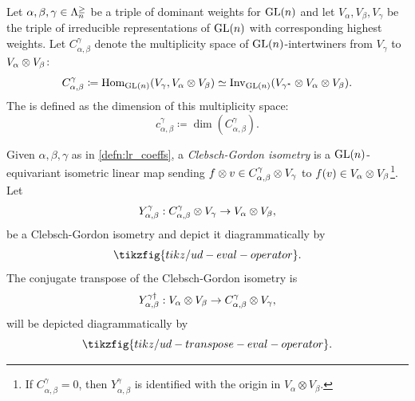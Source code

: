 \documentclass[notitlepage, 10pt]{article}
\begin{document}
\begin{defn}
    \label{defn:lr_coeffs}
    Let $\alpha, \beta, \gamma \in \Lambda^{\geq}_{n}$ be a triple of dominant weights for $\operatorname{GL}(n)$ and let $V_{\alpha},V_{\beta},V_{\gamma}$ be the triple of irreducible representations of $\operatorname{GL}(n)$ with corresponding highest weights.
    Let $C_{\alpha, \beta}^{\gamma}$ denote the multiplicity space of $\operatorname{GL}(n)$-intertwiners from $V_{\gamma}$ to $V_{\alpha} \otimes V_{\beta}$:
    \begin{equation}
        C_{\alpha, \beta}^{\gamma} \coloneqq \operatorname{Hom}_{\operatorname{GL}(n)}(V_{\gamma}, V_{\alpha}\otimes V_{\beta}) \simeq \operatorname{Inv}_{\operatorname{GL}(n)}(V_{\gamma^*} \otimes V_{\alpha} \otimes V_{\beta}).
    \end{equation}
    The  is defined as the dimension of this multiplicity space:
    \begin{equation}
        c_{\alpha,\beta}^{\gamma} \coloneqq \dim(C_{\alpha, \beta}^{\gamma}).
    \end{equation}
\end{defn}
\begin{defn}
    Given $\alpha,\beta,\gamma$ as in \cref{defn:lr_coeffs}, a \textit{Clebsch-Gordon isometry} is a $\operatorname{GL}(n)$-equivariant isometric linear map sending $f \otimes v \in C_{\alpha,\beta}^{\gamma} \otimes V_{\gamma}$ to $f(v) \in V_{\alpha}\otimes V_{\beta}$\footnote{If $C_{\alpha,\beta}^{\gamma} = 0$, then $Y_{\alpha,\beta}^{\gamma}$ is identified with the origin in $V_{\alpha}\otimes V_{\beta}$.}.
    Let
    \begin{equation}
        Y_{\alpha,\beta}^{\gamma} : C_{\alpha,\beta}^{\gamma} \otimes V_{\gamma} \to V_{\alpha} \otimes V_{\beta},
    \end{equation}
    be a Clebsch-Gordon isometry and depict it diagrammatically by
    \begin{equation}
        \tikzfig{tikz/ud-eval-operator}.
    \end{equation}
    The conjugate transpose of the Clebsch-Gordon isometry is 
    \begin{equation}
        Y_{\alpha,\beta}^{\gamma \dagger} : V_{\alpha} \otimes V_{\beta} \to C_{\alpha,\beta}^{\gamma} \otimes V_{\gamma},
    \end{equation}
    will be depicted diagrammatically by
    \begin{equation}
        \tikzfig{tikz/ud-transpose-eval-operator}.
    \end{equation}
\end{defn}
\end{document}
